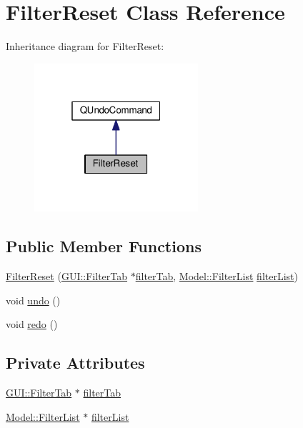 \hypertarget{classUndoRedo_1_1FilterReset}{}\section{Filter\+Reset Class Reference}
\label{classUndoRedo_1_1FilterReset}


Inheritance diagram for Filter\+Reset\+:
\nopagebreak
\begin{figure}[H]
\begin{center}
\leavevmode
\includegraphics[width=172pt]{classUndoRedo_1_1FilterReset__inherit__graph}
\end{center}
\end{figure}
\subsection*{Public Member Functions}
\begin{DoxyCompactItemize}
\item 
\hyperlink{classUndoRedo_1_1FilterReset_ad3b8cc0805524eea48dae6eb1bddbdeb}{Filter\+Reset} (\hyperlink{classGUI_1_1FilterTab}{G\+U\+I\+::\+Filter\+Tab} $\ast$\hyperlink{classUndoRedo_1_1FilterReset_a47ca82534a740774d79998759818d9f4}{filter\+Tab}, \hyperlink{classModel_1_1FilterList}{Model\+::\+Filter\+List} \hyperlink{classUndoRedo_1_1FilterReset_ae1c4986a96d35566c0c7ebce2eeada53}{filter\+List})
\item 
void \hyperlink{classUndoRedo_1_1FilterReset_a0e1e7804a53f6d62efc72c9bdbec8571}{undo} ()
\item 
void \hyperlink{classUndoRedo_1_1FilterReset_a93c48d6ed036e1a381be53ac67643284}{redo} ()
\end{DoxyCompactItemize}
\subsection*{Private Attributes}
\begin{DoxyCompactItemize}
\item 
\hyperlink{classGUI_1_1FilterTab}{G\+U\+I\+::\+Filter\+Tab} $\ast$ \hyperlink{classUndoRedo_1_1FilterReset_a47ca82534a740774d79998759818d9f4}{filter\+Tab}
\item 
\hyperlink{classModel_1_1FilterList}{Model\+::\+Filter\+List} $\ast$ \hyperlink{classUndoRedo_1_1FilterReset_ae1c4986a96d35566c0c7ebce2eeada53}{filter\+List}
\end{DoxyCompactItemize}


